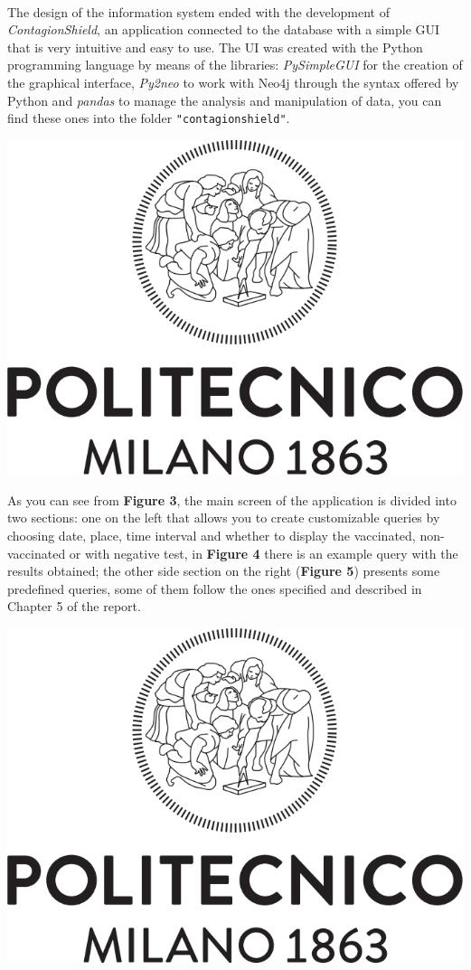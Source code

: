 \documentclass[a4paper,12pt]{article}
\begin{document}
\paragraph{}The design of the information system ended with the development of \emph{ContagionShield}, an application connected to the database with a simple GUI that is very intuitive and easy to use. The UI was created with the Python programming language by means of the libraries: \emph{PySimpleGUI} for the creation of the graphical interface, \emph{Py2neo} to work with Neo4j through the syntax offered by Python and \emph{pandas} to manage the analysis and manipulation of data, you can find these ones into the folder \texttt{"contagionshield"}. \par
	\begin{center}
 		\includegraphics[width = 11 cm]{polilogo.png}
	\end{center}
As you can see from \textbf{Figure 3}, the main screen of the application is divided into two sections: one on the left that allows you to create customizable queries by choosing date, place, time interval and whether to display the vaccinated, non-vaccinated or with negative test, in \textbf{Figure 4} there is an example query with the results obtained; the other side section on the right (\textbf{Figure 5}) presents some predefined queries, some of them follow the ones specified and described in Chapter 5 of the report. \par
	\begin{center}
 		\includegraphics[width = 11 cm]{polilogo.png}
	\end{center}
\end{document}
